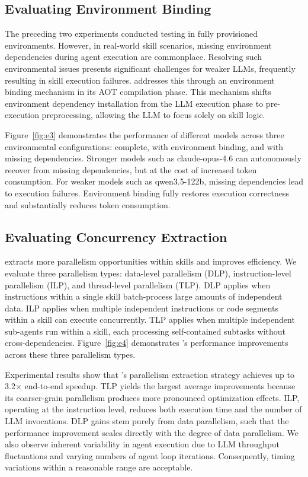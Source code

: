 \subsection{Evaluating Environment Binding}
\label{sec:eval:e3}

The preceding two experiments conducted testing in fully provisioned environments. However, in real-world skill scenarios, missing environment dependencies during agent execution are commonplace. Resolving such environmental issues presents significant challenges for weaker LLMs, frequently resulting in skill execution failures. \sys addresses this through an environment binding mechanism in its AOT compilation phase. This mechanism shifts environment dependency installation from the LLM execution phase to pre-execution preprocessing, allowing the LLM to focus solely on skill logic.

Figure~\ref{fig:e3} demonstrates the performance of different models across three environmental configurations: complete, with environment binding, and with missing dependencies.
Stronger models such as claude-opus-4.6 can autonomously recover from missing dependencies, but at the cost of increased token consumption.
For weaker models such as qwen3.5-122b, missing dependencies lead to execution failures.
Environment binding fully restores execution correctness and substantially reduces token consumption.

\subsection{Evaluating Concurrency Extraction}
\label{sec:eval:e4}

\sys extracts more parallelism opportunities within skills and improves efficiency.
We evaluate three parallelism types: data-level parallelism (DLP),
instruction-level parallelism (ILP), and thread-level parallelism (TLP).
DLP applies when instructions within a single skill batch-process large
amounts of independent data. ILP applies when multiple independent instructions
or code segments within a skill can execute concurrently. TLP applies when
multiple independent sub-agents run within a skill, each processing
self-contained subtasks without cross-dependencies. Figure~\ref{fig:e4}
demonstrates \sys's performance improvements across these three parallelism
types.

Experimental results show that \sys's parallelism extraction strategy
achieves up to 3.2$\times$ end-to-end speedup. TLP yields the largest
average improvements because its coarser-grain parallelism produces more
pronounced optimization effects. ILP, operating at the instruction level,
reduces both execution time and the number of LLM invocations. DLP gains
stem purely from data parallelism, such that the performance
improvement scales directly with the degree of data parallelism.
We also observe inherent variability in agent execution due to LLM throughput
fluctuations and varying numbers of agent loop iterations. Consequently,
timing variations within a reasonable range are acceptable.

